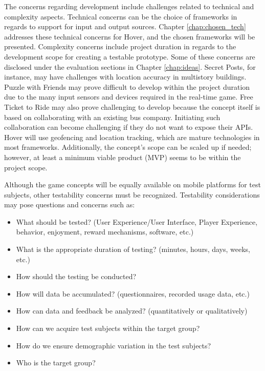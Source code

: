 \documentclass[../Main.tex]{subfiles}
\begin{document}
The concerns regarding development include challenges related to technical and complexity aspects. Technical concerns can be the choice of frameworks in regards to support for input and output sources. Chapter \ref{chap:chosen_tech} addresses these technical concerns for Hover, and the chosen frameworks will be presented. Complexity concerns include project duration in regards to the development scope for creating a testable prototype. Some of these concerns are disclosed under the evaluation sections in Chapter \ref{chap:ideas}. Secret Posts, for instance, may have challenges with location accuracy in multistory buildings. Puzzle with Friends may prove difficult to develop within the project duration due to the many input sensors and devices required in the real-time game. Free Ticket to Ride may also prove challenging to develop because the concept itself is based on collaborating with an existing bus company. Initiating such collaboration can become challenging if they do not want to expose their APIs. Hover will use geofencing and location tracking, which are mature technologies in most frameworks. Additionally, the concept’s scope can be scaled up if needed; however, at least a minimum viable product (MVP) seems to be within the project scope.

Although the game concepts will be equally available on mobile platforms for test subjects, other testability concerns must be recognized. Testability considerations may pose questions and concerns such as:


\begin{itemize}
    \item What should be tested?  (User Experience/User Interface, Player Experience, behavior, enjoyment, reward mechanisms, software, etc.)
    \item What is the appropriate duration of testing?  (minutes, hours, days, weeks, etc.)
    \item How should the testing be conducted? 
    \item How will data be accumulated? (questionnaires, recorded usage data, etc.)
    \item How can data and feedback be analyzed? (quantitatively or qualitatively)
    \item How can we acquire test subjects within the target group?
    \item How do we ensure demographic variation in the test subjects?
    \item Who is the target group?
\end{itemize}
\end{document}
